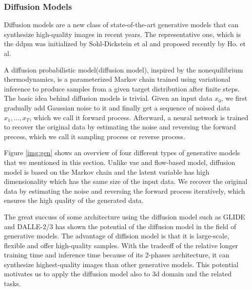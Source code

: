 \documentclass[12pt,DIV14,BCOR12mm,a4paper,footinclude=false,headinclude,parskip=half-,twoside,openright,cleardoublepage=empty,toc=index,bibliography=totoc,listof=totoc]{scrreprt}
\numberwithin{equation}{chapter}
\begin{document}
\subsubsection{Diffusion Models}
Diffusion models are a new class of state-of-the-art generative models that can synthesize high-quality images in recent years. The representative one, which is the \gls{ddpm} was initialized by Sohl-Dickstein et al\cite{sohldickstein2015deep} and proposed recently by Ho. et al\cite{ho2020denoising}. 

A diffusion probabilistic model(diffusion model), inspired by the nonequilibrium thermodynamics, is a parameterized Markov chain trained using variational inference to produce samples from a given target distribution after finite steps. The basic idea behind diffusion models is trivial. Given an input data $x_{0}$, we first gradually add Gaussian noise to it and finally get a sequence of noised data $x_{1},...,x_{T}$, which we call it forward process. Afterward, a neural network is trained to recover the original data by estimating the noise and reversing the forward precess, which we call it sampling process or reverse process.

Figure \ref{img:gen} shows an overview of four different types of generative models that we mentioned in this section. Unlike \gls{vae} and flow-based model, diffusion model is based on the Markov chain and the latent variable has high dimensionality which has the same size of the input data. We recover the original data by estimating the noise and reversing the forward process iteratively, which ensures the high quality of the generated data.

The great succuss of some architecture using the diffusion model such as GLIDE\cite{nichol2022glide} and DALLE-2/3\cite{ramesh2022hierarchical} has shown the potential of the diffusion model in the field of generative models. The advantage of diffision model is that it is large-scale, flexible and offer high-quality samples. With the tradeoff of the relative longer training time and inference time because of its 2-phases architecture, it can synthesize highest-quality images than other generative models. This potential motivates us to apply the diffusion model also to \gls{3d} domain and the related tasks.
\end{document}
